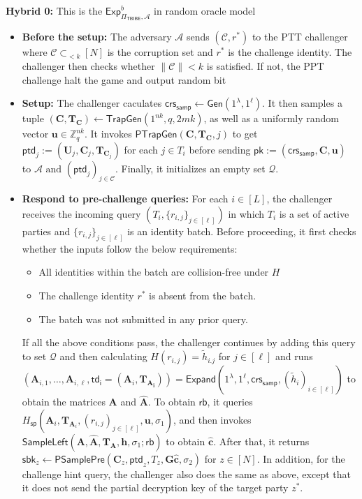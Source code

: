 \noindent\textbf{Hybrid 0:} This is the $\mathsf{Exp}_{\Pi_{\mathsf{TBIBE}},\mathcal{A}}^{b}$ in random oracle model
\begin{itemize}
    \item \textbf{Before the setup:}  The adversary $\mathcal{A}$ sends $(\mathcal{C}, r^*)$
to the PTT challenger where $\mathcal{C} \subset_{<k} [N]$ is the corruption set and $r^*$ is the challenge identity. The challenger then checks whether $\|\mathcal{C}\| < k$ is satisfied. If not, the PPT challenge halt the game and output random bit

\item \textbf{Setup:} The challenger caculates $\mathsf{crs}_{\mathsf{samp}} \leftarrow \mathsf{Gen}(1^\lambda,1^\ell)$. 
    It then samples a tuple 
    $(\mathbf{C},\mathbf{T}_{\mathbf{C}}) \leftarrow \mathsf{TrapGen}(1^{nk},q,2mk)$, 
    as well as a uniformly random vector $\mathbf{u} \in \mathbb{Z}_q^{nk}$. 
    It invokes $\mathsf{PTrapGen}(\mathbf{C}, \mathbf{T_C},j)$ to get $\mathsf{ptd}_j := (\mathbf{U}_j,\mathbf{C}_j, \mathbf{T}_{\mathbf{C}_j})$ for each $j \in T_i$ before sending 
    $\mathsf{pk}:=(\mathsf{crs}_{\mathsf{samp}}, \mathbf{C},\mathbf{u})$ to $\mathcal{A} \text{ and } (\mathsf{ptd}_j)_{j \in \mathcal{C}}$. Finally, it initializes an empty set $\mathcal{Q}$.

\item \textbf{Respond to pre-challenge queries:} For each $i \in [L]$, the challenger receives the incoming query $(T_i, \{r_{i,j}\}_{j\in[\ell]})$ in which $T_i$ is a set of active parties and $\{r_{i,j}\}_{j\in[\ell]}$ is an identity batch. Before proceeding, it first checks whether the inputs follow the below requirements:
\begin{itemize}
    \item All identities within the batch are collision-free under $H$
    \item The challenge identity $r^*$ is absent from the batch.
    \item The batch was not submitted in any prior query.
\end{itemize}

If all the above conditions pass, the challenger continues by adding this query to set $\mathcal{Q}$ and then calculating $H(r_{i,j})=\widetilde{h}_{i.j}$ for $j\in[\ell]$ and runs 
    $(\mathbf{A}_{i,1},\ldots,\mathbf{A}_{i,\ell},\mathsf{td_{i}}=(\mathbf{A}_i,\mathbf{T}_{\mathbf{A_i}}))
    =
    \mathsf{Expand}(1^\lambda,1^\ell,\mathsf{crs}_{\mathsf{samp}},
    (\widetilde{h}_i)_{i\in[\ell]})$ 
    to obtain the matrices $\mathbf{A}$ and $\widehat{\mathbf{A}}$. 
     To obtain $\mathsf{rb}$, it queries $H_{\mathsf{sp}}(\mathbf{A}_i,\mathbf{T}_{\mathbf{A}_i},(r_{i,j})_{j\in[\ell]},\mathbf{u},\sigma_1)$, and then invokes 
    $\mathsf{SampleLeft}(\mathbf{A},\widehat{\mathbf{A}},
    \mathbf{T}_{\mathbf{A}},\mathbf{h},\sigma_1;\mathsf{rb})$ 
    to obtain $\widehat{\mathbf{c}}$. After that, it returns 
    $\mathsf{sbk}_{z} \leftarrow 
    \mathsf{PSamplePre}(\mathbf{C}_z,\mathsf{ptd}_z,T_z,
    \mathbf{G}\widehat{\mathbf{c}},\sigma_2)$ for $z \in [N]$. In addition, for the challenge hint query, the challenger also does the same as above, except that it does not send the partial decryption key of the target party $z^*$.


\end{itemize}
